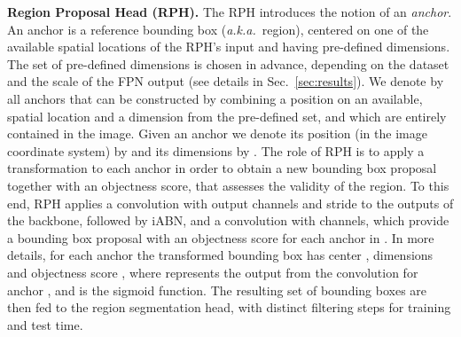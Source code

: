 \documentclass[10pt,twocolumn,letterpaper]{article}
\newcommand{\aka}{\emph{a.k.a.}\xspace }
\newcommand{\siABN}{\textrm{iABN}\xspace}
\renewcommand{\paragraph}[1]{
        \vspace{3pt}
	\noindent\textbf{#1}}
\begin{document}
\paragraph{Region Proposal Head (RPH).}
The RPH introduces the notion of an \emph{anchor}. An anchor is a reference bounding box (\aka~region), centered on one of the available spatial locations of the RPH's input and having pre-defined dimensions. The set of pre-defined dimensions is chosen in advance, depending on the dataset and the scale of the FPN output (see details in Sec.~\ref{sec:results}).
We denote by  all anchors that can be constructed by combining a position on an available, spatial location and a dimension from the pre-defined set, and which are entirely contained in the image.
Given an anchor  we denote its position (in the image coordinate system) by  and its dimensions by . 
The role of RPH is to apply a transformation to each anchor in order to obtain a new bounding box proposal together with an objectness score, that assesses the validity of the region.
To this end, RPH applies a  convolution with  output channels and stride  to the outputs of the backbone, followed by \siABN, and a  convolution with  channels, which provide a bounding box proposal with an objectness score for each anchor in . In more details, for each anchor  the transformed bounding box has center , dimensions  and objectness score , where  represents the output from the  convolution for anchor , and  is the sigmoid function. 
The resulting set of bounding boxes are then fed to the region segmentation head, with distinct filtering steps for training and test time.
\end{document}
